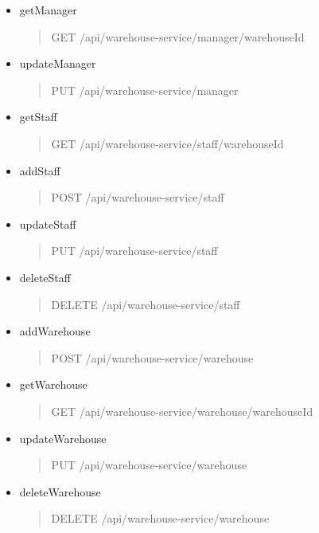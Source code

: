 \begin{itemize}
	\item getManager
	      \begin{quote}
		      GET /api/warehouse-service/manager/{warehouseId}
	      \end{quote}

	\item updateManager
	      \begin{quote}
		      PUT /api/warehouse-service/manager
	      \end{quote}

	\item getStaff
	      \begin{quote}
		      GET /api/warehouse-service/staff/{warehouseId}
	      \end{quote}

	\item addStaff
	      \begin{quote}
		      POST /api/warehouse-service/staff
	      \end{quote}

	\item updateStaff
	      \begin{quote}
		      PUT /api/warehouse-service/staff
	      \end{quote}

	\item deleteStaff
	      \begin{quote}
		      DELETE /api/warehouse-service/staff
	      \end{quote}

	\item addWarehouse
	      \begin{quote}
		      POST /api/warehouse-service/warehouse
	      \end{quote}

	\item getWarehouse
	      \begin{quote}
		      GET /api/warehouse-service/warehouse/{warehouseId}
	      \end{quote}

	\item updateWarehouse
	      \begin{quote}
		      PUT /api/warehouse-service/warehouse
	      \end{quote}

	\item deleteWarehouse
	      \begin{quote}
		      DELETE /api/warehouse-service/warehouse
	      \end{quote}
\end{itemize}

